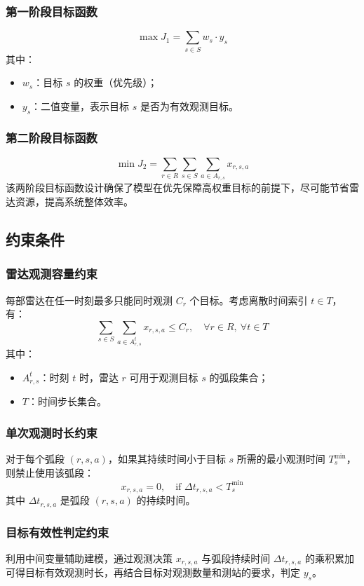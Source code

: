 \documentclass[openany,12pt,UTF8]{ctexart}
\begin{document}
\subsubsection{第一阶段目标函数}
$$
    \max J_1 = \sum_{s \in S} w_s \cdot y_s
$$
其中：
\begin{itemize}
    \item $w_s$：目标 $s$ 的权重（优先级）；
    \item $y_s$：二值变量，表示目标 $s$ 是否为有效观测目标。
\end{itemize}

\subsubsection{第二阶段目标函数}
$$
    \min J_2 = \sum_{r \in R}\sum_{s \in S}\sum_{a \in A_{r,s}} x_{r,s,a}
$$
该两阶段目标函数设计确保了模型在优先保障高权重目标的前提下，尽可能节省雷达资源，提高系统整体效率。

\subsection{约束条件}
\subsubsection{雷达观测容量约束}
每部雷达在任一时刻最多只能同时观测 $C_r$ 个目标。考虑离散时间索引 $t \in T$，有：
$$
    \sum_{s \in S} \sum_{a \in A_{r,s}^t} x_{r,s,a} \leq C_r, \quad \forall r \in R,\ \forall t \in T
$$
其中：
\begin{itemize}
    \item $A_{r,s}^t$：时刻 $t$ 时，雷达 $r$ 可用于观测目标 $s$ 的弧段集合；
    \item $T$：时间步长集合。
\end{itemize}

\subsubsection{单次观测时长约束}
对于每个弧段 $(r, s, a)$，如果其持续时间小于目标 $s$ 所需的最小观测时间 $T_s^{\min}$，则禁止使用该弧段：
$$
    x_{r,s,a} = 0, \quad \text{if } \Delta t_{r,s,a} < T_s^{\min}
$$
其中 $\Delta t_{r,s,a}$ 是弧段 $(r, s, a)$ 的持续时间。

\subsubsection{目标有效性判定约束}
利用中间变量辅助建模，通过观测决策 $x_{r,s,a}$ 与弧段持续时间 $\Delta t_{r,s,a}$ 的乘积累加可得目标有效观测时长，再结合目标对观测数量和测站的要求，判定 $y_s$。
\end{document}

